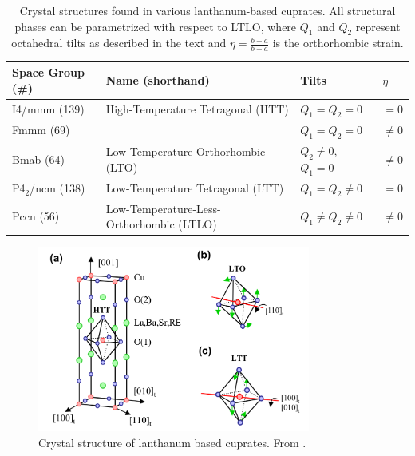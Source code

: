\begin{table}
	\centering
	\begin{tabular}{@{}llll@{}}
		\toprule
		Space Group (\#) & Name (shorthand)                         & Tilts                                    & $\eta$   \\ \midrule
		I4/mmm (139)     & High-Temperature Tetragonal (HTT)        & $Q_1=Q_2=0$                              & $=0$     \\
		Fmmm (69)        &                                          & $Q_1=Q_2=0$                              & $\neq 0$ \\
		Bmab (64)        & Low-Temperature Orthorhombic (LTO)       & $Q_2 \neq 0$, $Q_1 = 0$                  & $\neq 0$ \\
		P4$_2$/ncm (138) & Low-Temperature Tetragonal (LTT)         & $Q_1=Q_2 \neq 0$                         & $=0$     \\
		Pccn (56)        & Low-Temperature-Less-Orthorhombic (LTLO) & $Q_1 \neq Q_2 \neq 0$ & $\neq 0$ \\ \bottomrule
	\end{tabular}
	\caption[Crystal structures LSCO]{Crystal structures found in various lanthanum-based cuprates. All structural phases can be parametrized with respect to LTLO, where $Q_1$ and $Q_2$ represent octahedral tilts as described in the text and $\eta=\frac{b-a}{b+a}$ is the orthorhombic strain.}
	\label{tab:crystalstructures}
\end{table}

\begin{figure}
	\centering
	\includegraphics[width=0.8\textwidth]{fig/simulation/crystal_hucker.png}
	\caption[LSCO crystal]{Crystal structure of lanthanum based cuprates. From \cite{Hucker2012}. }
	\label{fig:lscocrystal}
\end{figure}

